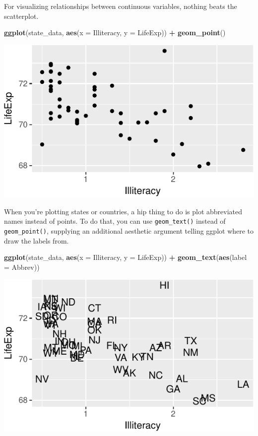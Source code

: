 \documentclass[
  12pt,
  oneside,openany]{book}
\newenvironment{Shaded}{\begin{snugshade}}{\end{snugshade}}
\newcommand{\DataTypeTok}[1]{\textcolor[rgb]{0.13,0.29,0.53}{#1}}
\newcommand{\KeywordTok}[1]{\textcolor[rgb]{0.13,0.29,0.53}{\textbf{#1}}}
\newcommand{\NormalTok}[1]{#1}
\newcommand{\OperatorTok}[1]{\textcolor[rgb]{0.81,0.36,0.00}{\textbf{#1}}}
\newcommand{\StringTok}[1]{\textcolor[rgb]{0.31,0.60,0.02}{#1}}
\begin{document}
For visualizing relationships between continuous variables, nothing beats the scatterplot.

\begin{Shaded}
\begin{Highlighting}[]
\KeywordTok{ggplot}\NormalTok{(state\_data, }\KeywordTok{aes}\NormalTok{(}\DataTypeTok{x =}\NormalTok{ Illiteracy, }\DataTypeTok{y =}\NormalTok{ LifeExp)) }\OperatorTok{+}
\StringTok{  }\KeywordTok{geom\_point}\NormalTok{()}
\end{Highlighting}
\end{Shaded}

\includegraphics{pdaps_files/figure-latex/scatter-1.pdf}

When you're plotting states or countries, a hip thing to do is plot abbreviated names instead of points. To do that, you can use \texttt{geom\_text()} instead of \texttt{geom\_point()}, supplying an additional aesthetic argument telling ggplot where to draw the labels from.

\begin{Shaded}
\begin{Highlighting}[]
\KeywordTok{ggplot}\NormalTok{(state\_data, }\KeywordTok{aes}\NormalTok{(}\DataTypeTok{x =}\NormalTok{ Illiteracy, }\DataTypeTok{y =}\NormalTok{ LifeExp)) }\OperatorTok{+}
\StringTok{  }\KeywordTok{geom\_text}\NormalTok{(}\KeywordTok{aes}\NormalTok{(}\DataTypeTok{label =}\NormalTok{ Abbrev))}
\end{Highlighting}
\end{Shaded}

\includegraphics{pdaps_files/figure-latex/scatter-text-1.pdf}
\end{document}
